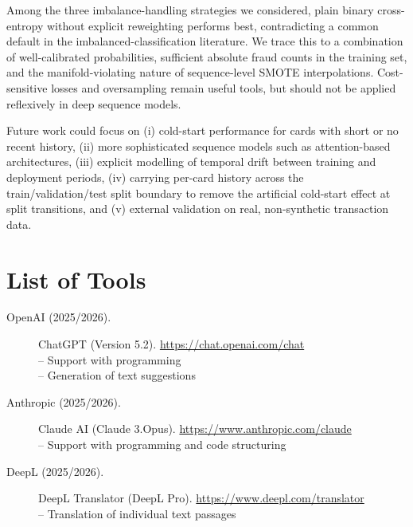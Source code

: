 \documentclass[oneside,12pt,parskip=half,american,numbers=noenddot]{scrreprt}
\begin{document}
Among the three imbalance-handling strategies we considered, plain 
binary cross-entropy without explicit reweighting performs best, 
contradicting a common default in the imbalanced-classification 
literature. We trace this to a combination of well-calibrated 
probabilities, sufficient absolute fraud counts in the training set, 
and the manifold-violating nature of sequence-level SMOTE 
interpolations. Cost-sensitive losses and oversampling remain useful 
tools, but should not be applied reflexively in deep sequence models.

Future work could focus on (i) cold-start performance for cards with 
short or no recent history, (ii) more sophisticated sequence models 
such as attention-based architectures, (iii) explicit modelling of 
temporal drift between training and deployment periods, (iv) carrying 
per-card history across the train/validation/test split boundary to 
remove the artificial cold-start effect at split transitions, and 
(v) external validation on real, non-synthetic transaction data.


\cleardoublepage
{}
\setcounter{page}{1}

\printbibliography
{} %


\chapter*{List of Tools}
\begin{description}
  \item[OpenAI (2025/2026).] ChatGPT (Version 5.2). \url{https://chat.openai.com/chat} \\
  – Support with programming \\
  – Generation of text suggestions

  \item[Anthropic (2025/2026).] Claude AI (Claude 3.Opus). \url{https://www.anthropic.com/claude} \\
  – Support with programming and code structuring

  \item[DeepL (2025/2026).] DeepL Translator (DeepL Pro). \url{https://www.deepl.com/translator} \\
  – Translation of individual text passages
\end{description}
\end{document}
